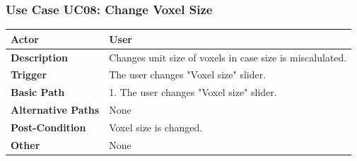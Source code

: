 \documentclass[paper=a4, fontsize=12pt]{scrartcl}	%
\numberwithin{equation}{section}		%
\numberwithin{figure}{section}			%
\numberwithin{table}{section}				%
\newcommand{\skipsubsection}[0]{\vspace{1cm}}
\begin{document}
    \subsubsection{Use Case UC08: Change Voxel Size}
    \begin{center}
    \end{center}
    	\begin{center}
        	\begin{tabular}{ | p{4cm} | p{9cm} |}
            	\hline
                	\textbf{Actor} & User\\ \hline
                    \textbf{Description} & Changes unit size of voxels in case size is miscalulated.\\ \hline
                    \textbf{Trigger} & The user changes "Voxel size" slider.\\ \hline
                    \textbf{Basic Path} & 1. The user changes "Voxel size" slider.\\ \hline
                    \textbf{Alternative Paths} & None\\ \hline
                    \textbf{Post-Condition} & Voxel size is changed.\\ \hline
                    \textbf{Other} & None\\
                \hline
            \end{tabular}
        \end{center}
    \skipsubsection
    
\end{document}
